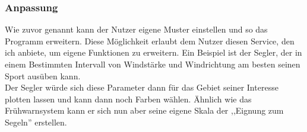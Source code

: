 \subsubsection{Anpassung} %
Wie zuvor genannt kann der Nutzer eigene Muster einstellen und so das Programm erweitern.
Diese Möglichkeit erlaubt dem Nutzer diesen Service,
den ich anbiete, um eigene Funktionen zu erweitern.
Ein Beispiel ist der Segler, der in einem Bestimmten
Intervall von Windstärke und Windrichtung am besten seinen Sport ausüben kann.\\
Der Segler würde sich diese Parameter dann für das Gebiet seiner
Interesse plotten lassen und kann dann noch Farben wählen.
Ähnlich wie das Frühwarnsystem kann er sich nun aber
seine eigene Skala der ,,Eignung zum Segeln'' erstellen.

